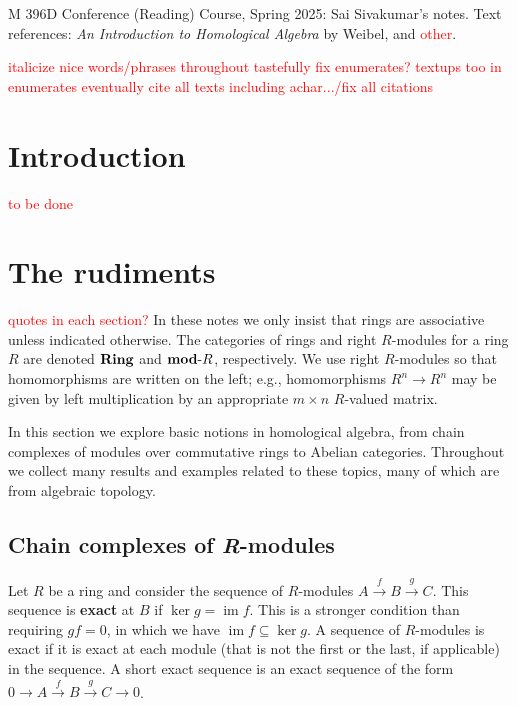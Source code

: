 \documentclass[11pt,leqno]{article}
\newcommand{\sai}[1]{\textcolor{red}{#1}}
\theoremstyle{plain}
\theoremstyle{definition}
\numberwithin{equation}{section}
\numberwithin{lem}{section}
\newcommand{\bidx}[1]{\textbf{#1\index{#1}}} %
\DeclareMathOperator{\im}{im}
\newcommand{\catname}[1]{{\normalfont\mathbf{#1}}}
\newcommand{\Ring}{\catname{Ring}}
\newcommand{\modR}{\catname{mod}\text{-}R}
\begin{document}
M 396D Conference (Reading) Course, Spring 2025: Sai Sivakumar's notes. Text references: \textit{An Introduction to Homological Algebra} by Weibel, and \sai{other}.
\tableofcontents\newpage

\sai{italicize nice words/phrases throughout tastefully}
\sai{fix enumerates? textups too in enumerates}
\sai{eventually cite all texts including achar.../fix all citations}
\section{Introduction}
\sai{to be done}
\section{The rudiments}\sai{quotes in each section?} In these notes we only insist that rings are associative unless indicated otherwise. The categories of rings and right $R$-modules for a ring $R$ are denoted $\Ring$ and $\modR$, respectively. We use right $R$-modules so that homomorphisms are written on the left; e.g., homomorphisms $R^n\to R^n$ may be given by left multiplication by an appropriate $m\times n$ $R$-valued matrix.

In this section we explore basic notions in homological algebra, from chain complexes of modules over commutative rings to Abelian categories. Throughout we collect many results and examples related to these topics, many of which are from algebraic topology.

\subsection{Chain complexes of \textit{R}-modules}

Let $R$ be a ring and consider the sequence of $R$-modules $A\xrightarrow{f}B\xrightarrow{g}C$. This sequence is \bidx{exact} at $B$ if $\ker g = \im f$. This is a stronger condition than requiring $gf = 0$, in which we have $\im f\subseteq \ker g$. A sequence of $R$-modules is exact if it is exact at each module (that is not the first or the last, if applicable) in the sequence. A short exact sequence is an exact sequence of the form $0\to A\xrightarrow{f}B\xrightarrow{g}C\to 0$.
\end{document}
